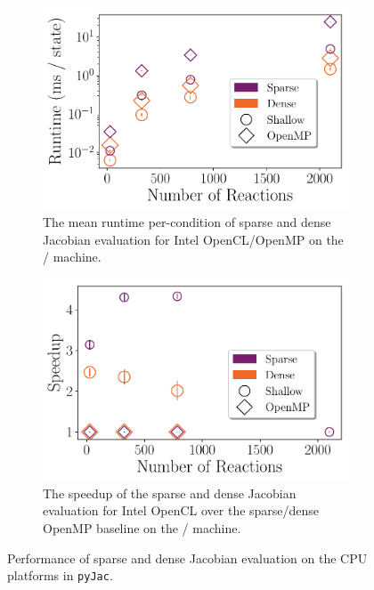 \documentclass[12pt,number,sort&compress,preprint]{elsarticle}
\begin{document}
\begin{figure}[htbp]
\begin{subfigure}[t]{0.48\linewidth}
      \includegraphics[width=\textwidth]{sparse_vs_dense_sse.pdf}
      \caption{The mean runtime per-condition of sparse and dense Jacobian evaluation for Intel OpenCL\slash OpenMP on the \sse/ machine.}
      \label{F:sparse_vs_dense_sse}
  \end{subfigure}
  \hfill
  \begin{subfigure}[t]{0.48\linewidth}
      \includegraphics[width=\textwidth]{sparse_vs_dense_sse_speedup.pdf}
      \caption{The speedup of the sparse and dense Jacobian evaluation for Intel OpenCL over the sparse\slash dense OpenMP baseline on the \sse/ machine.}
      \label{F:sparse_vs_dense_sse_speedup}
  \end{subfigure}
  \caption{Performance of sparse and dense Jacobian evaluation on the CPU platforms in \texttt{pyJac}.}
  \label{F:jacobian_perfomance}
\end{figure}
\end{document}
